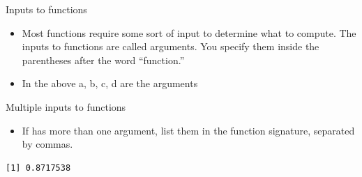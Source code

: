 \documentclass[
  ignorenonframetext,
]{beamer}
\newenvironment{Shaded}{\begin{snugshade}}{\end{snugshade}}
\newcommand{\AttributeTok}[1]{\textcolor[rgb]{0.40,0.45,0.13}{#1}}
\newcommand{\FunctionTok}[1]{\textcolor[rgb]{0.28,0.35,0.67}{#1}}
\newcommand{\NormalTok}[1]{\textcolor[rgb]{0.00,0.23,0.31}{#1}}
\newcommand{\SpecialCharTok}[1]{\textcolor[rgb]{0.37,0.37,0.37}{#1}}
\providecommand{\tightlist}{%
  \setlength{\itemsep}{0pt}\setlength{\parskip}{0pt}}\usepackage{longtable,booktabs,array}
\begin{document}
\begin{frame}[fragile]
\begin{block}{Inputs to functions}
\protect\hypertarget{inputs-to-functions}{}
\begin{itemize}
\tightlist
\item
  Most functions require some sort of input to determine what to
  compute. The inputs to functions are called arguments. You specify
  them inside the parentheses after the word ``function.''
\item
  In the above a, b, c, d are the arguments
\end{itemize}
\end{block}

\begin{block}{Multiple inputs to functions}
\protect\hypertarget{multiple-inputs-to-functions}{}
\begin{itemize}
\tightlist
\item
  If has more than one argument, list them in the function signature,
  separated by commas.
\end{itemize}

\begin{Shaded}
\end{Shaded}

\begin{verbatim}
[1] 0.8717538
\end{verbatim}
\end{block}
\end{frame}
\end{document}
